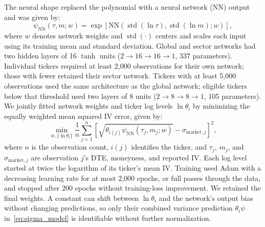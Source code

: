 The neural shape replaced the polynomial with a neural network (NN) output and was given by:
\begin{equation}\label{eq:psi_nn}
    \psi_{\mathrm{NN}}(\tau,m;w)
    =\exp\!\left[\mathrm{NN}\!\left(
    \operatorname{std}(\ln\tau),\operatorname{std}(\ln m);w\right)\right],
\end{equation}
where $w$ denotes network weights and $\operatorname{std}(\cdot)$ centers and scales each input using its training mean and standard deviation. Global and sector networks had two hidden layers of 16 $\tanh$ units ($2\to16\to16\to1$, 337 parameters). Individual tickers required at least 2{,}000 observations for their own network; those with fewer retained their sector network. Tickers with at least 5{,}000 observations used the same architecture as the global network; eligible tickers below that threshold used two layers of 8 units ($2\to8\to8\to1$, 105 parameters). We jointly fitted network weights and ticker log levels $\ln\theta_i$ by minimizing the equally weighted mean squared IV error, given by:
\begin{equation}\label{eq:nn_loss}
 \min_{w,\{\ln\theta_i\}}
 \frac{1}{n}\sum_{j=1}^{n}
 \left[
 \sqrt{\theta_{i(j)}\psi_{\mathrm{NN}}(\tau_j,m_j;w)}
 -\sigma_{\mathrm{market},j}
 \right]^2,
\end{equation}
where $n$ is the observation count, $i(j)$ identifies the ticker, and $\tau_j$, $m_j$, and $\sigma_{\mathrm{market},j}$ are observation $j$'s DTE, moneyness, and reported IV. Each log level started at twice the logarithm of its ticker's mean IV. Training used Adam with a decreasing learning rate for at most 2{,}000 epochs, or full passes through the data, and stopped after 200 epochs without training-loss improvement. We retained the final weights. A constant can shift between $\ln\theta_i$ and the network's output bias without changing predictions, so only their combined variance prediction $\theta_i\psi$ in~\eqref{eq:sigma_model} is identifiable without further normalization.

